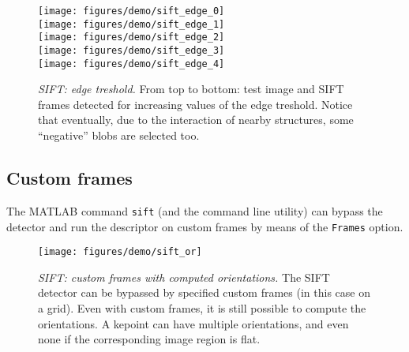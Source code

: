 \documentclass[9pt]{article}
\newcommand{\cmd}  [1]{{\color{red}\tt   #1}}
\newcommand{\param}[1]{{\color{red}\tt   #1}}
\begin{document}
\begin{figure}[h]
\begin{center}
\texttt{[image: figures/demo/sift\_edge\_0]}\\
\texttt{[image: figures/demo/sift\_edge\_1]}\\
\texttt{[image: figures/demo/sift\_edge\_2]}\\
\texttt{[image: figures/demo/sift\_edge\_3]}\\
\texttt{[image: figures/demo/sift\_edge\_4]}
\end{center}
\caption{{\em SIFT: edge treshold.} From top to bottom: test image and
  SIFT frames detected for increasing values of the edge
  treshold. Notice that eventually, due to the interaction of nearby
  structures, some ``negative'' blobs are selected too.}
\label{fig:sift-edge-tresh}
\end{figure}

\subsection{Custom frames}\label{sift.custom}

The MATLAB command \cmd{sift} (and the command line utility) can
bypass the detector and run the descriptor on custom frames by means
of the \param{Frames} option.

\begin{figure}[t]
\begin{center}
\texttt{[image: figures/demo/sift\_or]}
\end{center}
\caption{{\em SIFT: custom frames with computed orientations.}  The
  SIFT detector can be bypassed by specified custom frames (in this
  case on a grid).  Even with custom frames, it is still possible to
  compute the orientations. A kepoint can have multiple orientations,
  and even none if the corresponding image region is flat.  }
\label{fig:sift-custom-or}
\end{figure}
\end{document}
